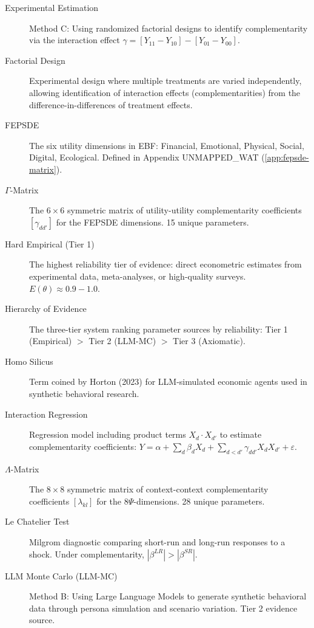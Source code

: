 \documentclass[11pt,a4paper]{article}
\theoremstyle{definition}
\begin{document}
\begin{description}
\item[Experimental Estimation]
Method C: Using randomized factorial designs to identify complementarity via 
the interaction effect $\gamma = [Y_{11} - Y_{10}] - [Y_{01} - Y_{00}]$.

\item[Factorial Design]
Experimental design where multiple treatments are varied independently, 
allowing identification of interaction effects (complementarities) from 
the difference-in-differences of treatment effects.

\item[FEPSDE]
The six utility dimensions in EBF: Financial, Emotional, Physical, 
Social, Digital, Ecological. Defined in Appendix UNMAPPED_WAT (\ref{app:fepsde-matrix}).

\item[$\Gamma$-Matrix]
The $6 \times 6$ symmetric matrix of utility-utility complementarity 
coefficients $[\gamma_{dd'}]$ for the FEPSDE dimensions. 15 unique parameters.

\item[Hard Empirical (Tier 1)]
The highest reliability tier of evidence: direct econometric estimates from 
experimental data, meta-analyses, or high-quality surveys. $E(\theta) \approx 0.9-1.0$.

\item[Hierarchy of Evidence]
The three-tier system ranking parameter sources by reliability: 
Tier 1 (Empirical) $>$ Tier 2 (LLM-MC) $>$ Tier 3 (Axiomatic).

\item[Homo Silicus]
Term coined by Horton (2023) for LLM-simulated economic agents used in 
synthetic behavioral research.

\item[Interaction Regression]
Regression model including product terms $X_d \cdot X_{d'}$ to estimate 
complementarity coefficients: $Y = \alpha + \sum_d \beta_d X_d + \sum_{d<d'} \gamma_{dd'} X_d X_{d'} + \varepsilon$.

\item[$\Lambda$-Matrix]
The $8 \times 8$ symmetric matrix of context-context complementarity 
coefficients $[\lambda_{kl}]$ for the 8$\Psi$-dimensions. 28 unique parameters.

\item[Le Chatelier Test]
Milgrom diagnostic comparing short-run and long-run responses to a shock. 
Under complementarity, $|\beta^{LR}| > |\beta^{SR}|$.

\item[LLM Monte Carlo (LLM-MC)]
Method B: Using Large Language Models to generate synthetic behavioral data 
through persona simulation and scenario variation. Tier 2 evidence source.


\end{description}
\end{document}
